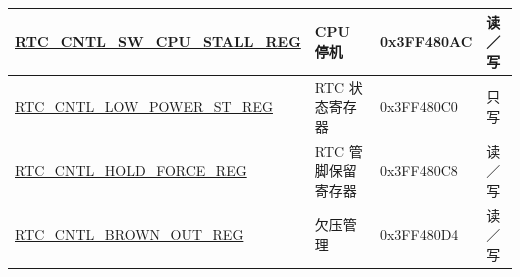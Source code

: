 \begin{longtable}{ | p{6.5cm} | p{5cm} | p{2cm} | p{2cm} | }
\hyperref[regdesc:RTCCNTLSWCPUSTALLREG]{RTC\_CNTL\_SW\_CPU\_STALL\_REG} & CPU 停机 & 0x3FF480AC & 读／写 \\ \hline
\hyperref[regdesc:RTCCNTLLOWPOWERSTREG]{RTC\_CNTL\_LOW\_POWER\_ST\_REG} & RTC 状态寄存器 & 0x3FF480C0 & 只写 \\\hline
\hyperref[regdesc:RTCCNTLHOLDFORCEREG]{RTC\_CNTL\_HOLD\_FORCE\_REG} & RTC 管脚保留寄存器 & 0x3FF480C8 & 读／写 \\ \hline
\hyperref[regdesc:RTCCNTLBROWNOUTREG]{RTC\_CNTL\_BROWN\_OUT\_REG} & 欠压管理 & 0x3FF480D4 & 读／写 \\ \hline
\end{longtable}
